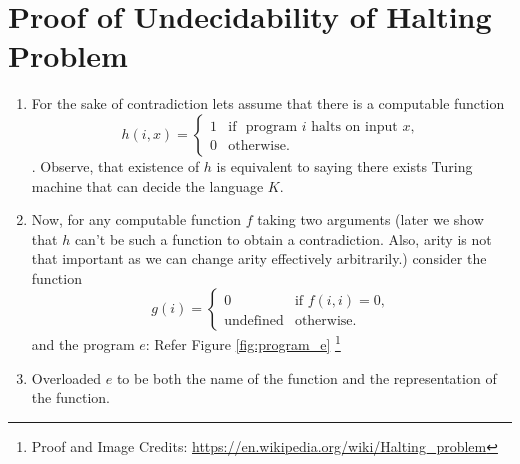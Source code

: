 \documentclass[
11pt,notheorems,hyperref={pdfauthor=whatever}
]{beamer}
\begin{document}
\section{Proof of Undecidability of Halting Problem}
\begin{frame}
\begin{enumerate}
    \item For the sake of contradiction lets assume that there is a computable function $$h(i, x) = \begin{cases}
  1 & \text{if } \text{  program }i\text{ halts on input }x, \\
  0 & \text{otherwise.}
\end{cases}$$. Observe, that existence of $h$ is equivalent to saying there exists Turing machine that can decide the language $K$.
    \item Now, for any computable function $f$ taking two arguments (later we show that $h$ can't be such a function to obtain a contradiction. Also, arity is not that important as we can change arity effectively arbitrarily.) consider the function $$g(i) = \begin{cases}
  0  & \text{if } f(i,i) = 0,\\
  \text{undefined} & \text{otherwise.}
\end{cases}$$ and the program $e$: Refer Figure \ref{fig:program_e} \footnote{Proof and Image Credits: \url{https://en.wikipedia.org/wiki/Halting\_problem}}
    \item Overloaded $e$ to be both the name of the function and the representation of the function.
\end{enumerate}
\end{frame}
\end{document}
